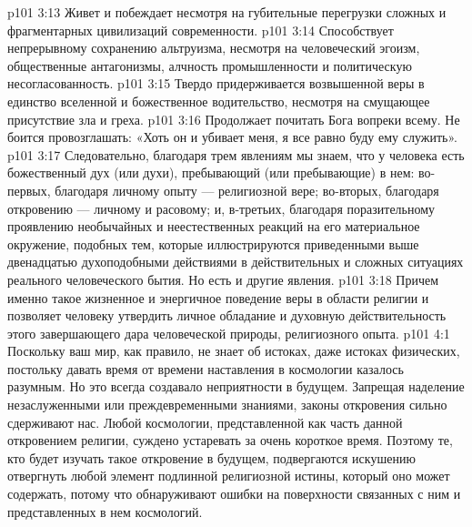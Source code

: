 \vs p101 3:13 \bibnobreakspace Живет и побеждает несмотря на губительные перегрузки сложных и фрагментарных цивилизаций современности.
\vs p101 3:14 \bibnobreakspace Способствует непрерывному сохранению альтруизма, несмотря на человеческий эгоизм, общественные антагонизмы, алчность промышленности и политическую несогласованность.
\vs p101 3:15 \bibnobreakspace Твердо придерживается возвышенной веры в единство вселенной и божественное водительство, несмотря на смущающее присутствие зла и греха.
\vs p101 3:16 \bibnobreakspace Продолжает почитать Бога вопреки всему. Не боится провозглашать: «Хоть он и убивает меня, я все равно буду ему служить».
\vs p101 3:17 \pc Следовательно, благодаря трем явлениям мы знаем, что у человека есть божественный дух (или духи), пребывающий (или пребывающие) в нем: во\hyp{}первых, благодаря личному опыту --- религиозной вере; во\hyp{}вторых, благодаря откровению --- личному и расовому; и, в\hyp{}третьих, благодаря поразительному проявлению необычайных и неестественных реакций на его материальное окружение, подобных тем, которые иллюстрируются приведенными выше двенадцатью духоподобными действиями в действительных и сложных ситуациях реального человеческого бытия. Но есть и другие явления.
\vs p101 3:18 Причем именно такое жизненное и энергичное поведение веры в области религии и позволяет человеку утвердить личное обладание и духовную действительность этого завершающего дара человеческой природы, религиозного опыта.
\vs p101 4:1 Поскольку ваш мир, как правило, не знает об истоках, даже истоках физических, постольку давать время от времени наставления в космологии казалось разумным. Но это всегда создавало неприятности в будущем. Запрещая наделение незаслуженными или преждевременными знаниями, законы откровения сильно сдерживают нас. Любой космологии, представленной как часть данной откровением религии, суждено устаревать за очень короткое время. Поэтому те, кто будет изучать такое откровение в будущем, подвергаются искушению отвергнуть любой элемент подлинной религиозной истины, который оно может содержать, потому что обнаруживают ошибки на поверхности связанных с ним и представленных в нем космологий.
